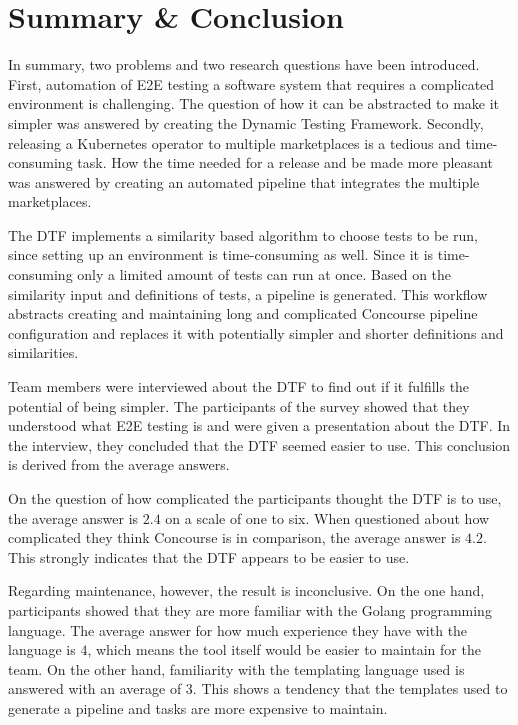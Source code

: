 \chapter{Summary \& Conclusion}\label{ch:conclusion}

In summary, two problems and two research questions have been introduced.
First, automation of E2E testing a software system that requires a complicated environment is challenging.
The question of how it can be abstracted to make it simpler was answered by creating the Dynamic Testing Framework.
Secondly, releasing a Kubernetes operator to multiple marketplaces is a tedious and time-consuming task.
How the time needed for a release and be made more pleasant was answered by creating an automated pipeline that integrates the multiple marketplaces.

The DTF implements a similarity based algorithm to choose tests to be run, since setting up an environment is time-consuming as well.
Since it is time-consuming only a limited amount of tests can run at once.
Based on the similarity input and definitions of tests, a pipeline is generated.
This workflow abstracts creating and maintaining long and complicated Concourse pipeline configuration and replaces it with potentially simpler and shorter definitions and similarities.

Team members were interviewed about the DTF to find out if it fulfills the potential of being simpler.
The participants of the survey showed that they understood what E2E testing is and were given a presentation about the DTF.
In the interview, they concluded that the DTF seemed easier to use.
This conclusion is derived from the average answers.

On the question of how complicated the participants thought the DTF is to use, the average answer is $2.4$ on a scale of one to six.
When questioned about how complicated they think Concourse is in comparison, the average answer is $4.2$.
This strongly indicates that the DTF appears to be easier to use.

Regarding maintenance, however, the result is inconclusive.
On the one hand, participants showed that they are more familiar with the Golang programming language.
The average answer for how much experience they have with the language is $4$, which means the tool itself would be easier to maintain for the team.
On the other hand, familiarity with the templating language used is answered with an average of $3$.
This shows a tendency that the templates used to generate a pipeline and tasks are more expensive to maintain.

